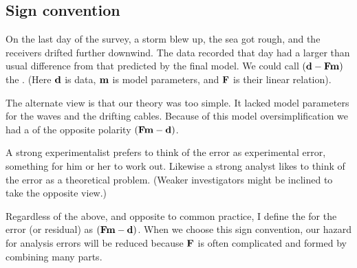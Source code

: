 \subsection{Sign convention}
On the last day of the survey, a storm blew up,
the sea got rough, and the receivers drifted further downwind.
The data recorded that day
had a larger than usual difference
from that predicted by the final model.
We could call
$(\bold d-\bold F\bold m)$
the {\it {}}.
(Here
$\bold d$ is data,
$\bold m$ is model parameters, and
$\bold F$ is their linear relation).

\par
The alternate view is that our theory was too simple.
It lacked model parameters for the waves and the drifting cables.
Because of this model oversimplification
we had a {\it {}} of the opposite polarity
$(\bold F\bold m-\bold d)$.
\par
A strong experimentalist prefers to think of the error
as experimental error, something for him or her to work out.
Likewise a strong analyst likes to think
of the error as a theoretical problem.
(Weaker investigators might be inclined to take the opposite view.)

\par
Regardless of the above, and opposite to common practice,
I define the  for the error (or residual) as
$(\bold F\bold m-\bold d)$.
When we choose this sign convention,
our hazard for analysis errors will be reduced
because $\bold F$ is often complicated and formed by combining many parts.
\begin{comment}
So in this book
we see positive signs on operators
and we see residuals initialized by the negative of the data,
often with subroutine \texttt{negcopy()}.
\progdex{negcopy}{copy and negate}
\end{comment}
\par
{}
\par

